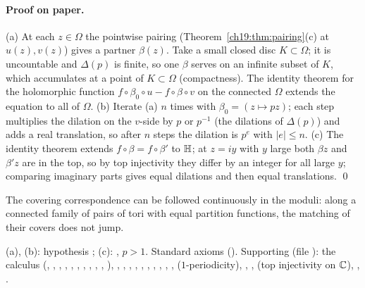 \paragraph{Proof on paper.}  (a) At each $z\in\Omega$ the pointwise pairing (Theorem~\ref{ch19:thm:pairing}(c) at $u(z),v(z)$) gives a
partner $\beta(z)$.  Take a small closed disc $K\subset\Omega$; it is uncountable and $\Delta(p)$ is finite, so one $\beta$ serves on an
infinite subset of $K$, which accumulates at a point of $K\subset\Omega$ (compactness).  The identity theorem for the holomorphic
function $f\circ\beta_0\circ u-f\circ\beta\circ v$ on the connected $\Omega$ extends the equation to all of $\Omega$.  (b) Iterate (a) $n$ times
with $\beta_0=(z\mapsto pz)$; each step multiplies the dilation on the $v$-side by $p$ or $p^{-1}$ (the dilations of $\Delta(p)$) and adds a
real translation, so after $n$ steps the dilation is $p^e$ with $|e|\le n$.  (c) The identity theorem extends $f\circ\beta=f\circ\beta'$
to $\mathbb{H}$; at $z=iy$ with $y$ large both $\beta z$ and $\beta'z$ are in the top, so by top injectivity they differ by an
integer for all large $y$; comparing imaginary parts gives equal dilations and then equal translations. \qed
\begin{physics}The covering correspondence can be followed continuously in the moduli: along a connected family of pairs
of tori with equal partition functions, the matching of their covers does not jump.\end{physics}
\begin{status}(a), (b): hypothesis ; (c): , $p>1$.  Standard axioms
().  Supporting (file ): the
 calculus (, , , , ,
, , , , ,
), , , , ,
, , , ,
, ,  ($1$-periodicity),
, ,  (top injectivity on ${\mathbb{C}}$),
, .\end{status}

